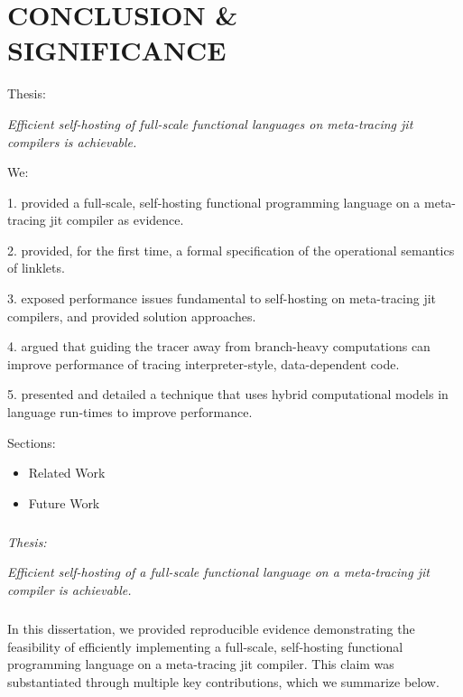 \chapter[\texorpdfstring{CONCLUSION \& SIGNIFICANCE}
                          {8. Conclusion}]{CONCLUSION \& SIGNIFICANCE}

    \label{chapter:conclusion}

    \begin{chaptersynopsis}
        Thesis:

        \textit{Efficient self-hosting of full-scale functional languages on meta-tracing \gls{jit} compilers is achievable.}

        We:

        1. provided a full-scale, self-hosting functional programming language on a meta-tracing \gls{jit} compiler as evidence.

        2. provided, for the first time, a formal specification of the operational semantics of linklets.

        3. exposed performance issues fundamental to self-hosting on meta-tracing \gls{jit} compilers, and provided solution approaches.

        4. argued that guiding the tracer away from branch-heavy computations can improve performance of tracing interpreter-style, data-dependent code.

        5. presented and detailed a technique that uses hybrid computational models in language run-times to improve performance.


        \vspace{2em}

        Sections:
		\begin{itemize}
			\item Related Work
			\item Future Work
		\end{itemize}
    \end{chaptersynopsis}

    \paragraph{} \textit{Thesis:}

    \textit{Efficient self-hosting of a full-scale functional language on a meta-tracing \gls{jit} compiler is achievable.}

    \paragraph{}%
        In this dissertation, we provided reproducible evidence demonstrating the feasibility of efficiently implementing a full-scale, self-hosting functional programming language on a meta-tracing \gls{jit} compiler. This claim was substantiated through multiple key contributions, which we summarize below.

